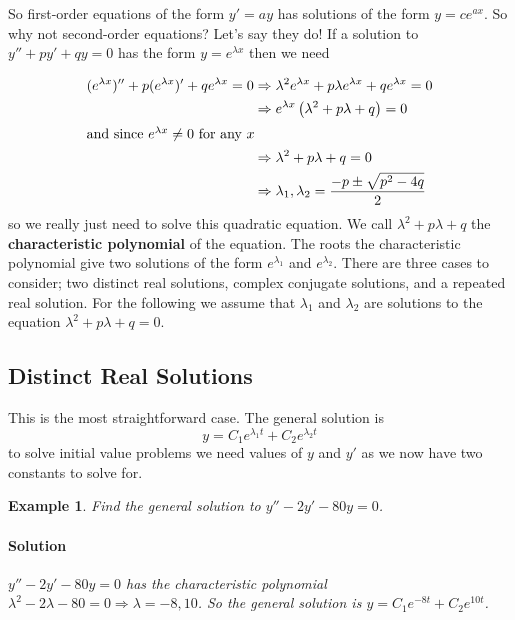 \documentclass[letterpaper, 11pt, openany]{book}
\theoremstyle{mytheoremstyle}
\theoremstyle{myexamplestyle}
\newtheorem{example}{Example}[section]
\newenvironment{solution}{\paragraph{\sffamily \smaller \fontseries{b}\selectfont Solution}}{\hfill\faSquare}
\begin{document}
So first-order equations of the form \(y' = a y\) has solutions of the form \(y = c e^{a x}\). So why not second-order equations? Let's say they do! If a solution to \(y'' + p y' + q y = 0\) has the form \(y = e^{\lambda x}\) then we need

\begin{align*}
    (e^{\lambda x})'' + p(e^{\lambda x})' + q e^{\lambda x} = 0 &\Rightarrow \lambda^{2} e^{\lambda x} + p \lambda e^{\lambda x} + q e^{\lambda x} = 0\\
                                                                &\Rightarrow e^{\lambda x} \left(\lambda^{2} + p \lambda  + q\right)  = 0\\
    \intertext{and since \(e^{\lambda x} \neq 0\) for any \(x\)}
                                                                &\Rightarrow \lambda^{2} + p \lambda  + q = 0\\
                                                                &\Rightarrow \lambda_{1}, \lambda_{2} = \frac{-p \pm \sqrt{p^{2} - 4q}}{2}
\end{align*}
so we really just need to solve this quadratic equation. We call \(\lambda^{2} + p \lambda  + q\) the \textbf{characteristic polynomial} of the equation. The roots the characteristic polynomial give two solutions of the form \(e^{\lambda_{1}}\) and \(e^{\lambda_{2}}\). There are three cases to consider; two distinct real solutions, complex conjugate solutions, and a repeated real solution. For the following we assume that \(\lambda_{1}\) and \(\lambda_{2}\) are solutions to the equation \(\lambda^{2} + p \lambda  + q = 0\).

\subsection{Distinct Real Solutions}

This is the most straightforward case. The general solution is
\[y = C_{1} e^{\lambda_{1} t} + C_{2} e^{\lambda_{2} t}\]
to solve initial value problems we need values of \(y\) and \(y'\) as we now have two constants to solve for.

\begin{example}\label{e:de-2o-hcc-general}
    Find the general solution to \(y'' - 2y' - 80y = 0\).
    \begin{solution}
        \(y'' - 2y' - 80y = 0\) has the characteristic polynomial \(\lambda^{2} - 2\lambda - 80 =0 \Rightarrow \lambda = -8, 10\). So the general solution is \(y = C_{1} e^{-8t} + C_{2} e^{10t}\).
    \end{solution} 
\end{example}
\end{document}

